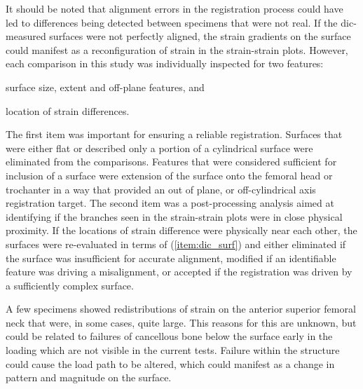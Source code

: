 It should be noted that alignment errors in the registration process could have led to differences being detected between specimens that were not real.
If the \ac{dic}-measured surfaces were not perfectly aligned, the strain gradients on the surface could manifest as a reconfiguration of strain in the strain-strain plots.
However, each comparison in this study was individually inspected for two features:
\begin{inparaenum}[i\upshape)]
\item \label{item:dic_surf} surface size, extent and off-plane features, and
\item location of strain differences.
\end{inparaenum}
The first item was important for ensuring a reliable registration.
Surfaces that were either flat or described only a portion of a cylindrical surface were eliminated from the comparisons.
Features that were considered sufficient for inclusion of a surface were extension of the surface onto the femoral head or trochanter in a way that provided an out of plane, or off-cylindrical axis registration target.
The second item was a post-processing analysis aimed at identifying if the branches seen in the strain-strain plots were in close physical proximity.
If the locations of strain difference were physically near each other, the surfaces were re-evaluated in terms of (\ref{item:dic_surf}) and either eliminated if the surface was insufficient for accurate alignment, modified if an identifiable feature was driving a misalignment, or accepted if the registration was driven by a sufficiently complex surface.


A few specimens showed redistributions of strain on the anterior superior femoral neck that were, in some cases, quite large.
This reasons for this are unknown, but could be related to failures of cancellous bone below the surface early in the loading which are not visible in the current tests.
Failure within the structure could cause the load path to be altered, which could manifest as a change in pattern and magnitude on the surface.

